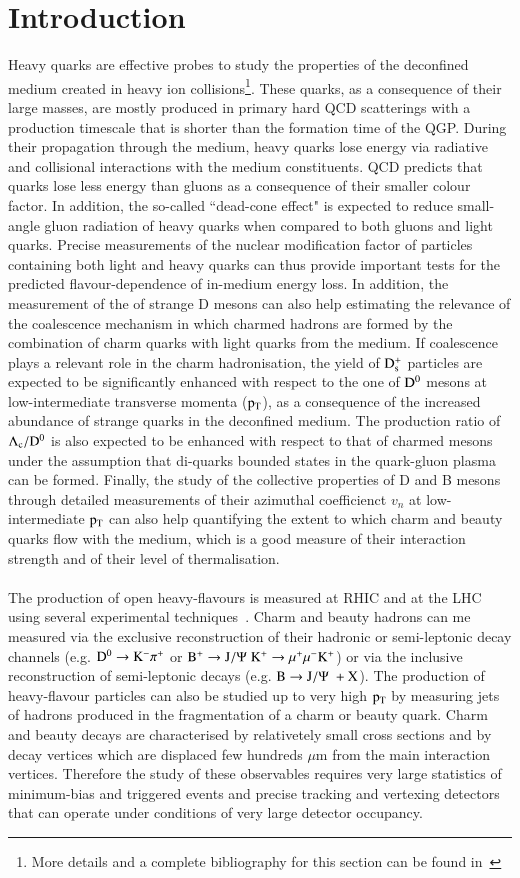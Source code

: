 \documentclass{webofc}
\begin{document}
\section{Introduction}
\label{intro}
Heavy quarks are effective probes to study the properties of the deconfined medium created in heavy ion collisions\footnote{More details and a complete bibliography for this section can 
be found in~\cite{saporegravis}}. These quarks, as a consequence of their large masses, are mostly produced in primary hard QCD scatterings with a production 
timescale that is shorter than the formation time of the QGP. During their propagation through the medium, heavy quarks lose energy via radiative and collisional 
interactions with the medium constituents. QCD predicts that quarks lose less energy than gluons as a consequence of their smaller colour factor. 
In addition, the so-called ``dead-cone effect" is expected to reduce small-angle gluon radiation of heavy quarks when compared to both 
gluons and light quarks. Precise measurements of the nuclear modification factor \raa of particles containing both light and heavy quarks can thus 
provide important tests for the predicted flavour-dependence of in-medium energy loss. In addition, the measurement of the \raa of strange D mesons 
can also help estimating the relevance of the coalescence mechanism in which charmed hadrons are formed 
by the combination of charm quarks with light quarks from the medium. If coalescence plays a relevant role in the charm hadronisation, 
the yield of $\rm D_{s}^{+}$ particles are expected to be significantly enhanced with respect to the one of $\rm D^{0}$ mesons at low-intermediate transverse momenta ($\rm p_{\rm T} $), 
as a consequence of the increased abundance of strange quarks in the deconfined medium. The production ratio of $\rm \Lambda_{c}/\rm D^{0}$ 
is also expected to be enhanced with respect to that of charmed mesons under the assumption that di-quarks bounded states in the 
quark-gluon plasma can be formed. Finally, the study of the collective properties of D and B mesons through detailed measurements of their azimuthal coefficienct $v_{n}$ 
at low-intermediate $\rm p_{\rm T} $ can also help quantifying the extent to which charm and beauty quarks flow with the medium, 
which is a good measure of their interaction strength and  of their level of thermalisation.
\\ \\
The production of open heavy-flavours is measured at RHIC and at the LHC using several experimental techniques~\cite{saporegravis}. Charm and beauty hadrons can me measured via the exclusive reconstruction 
of their hadronic or semi-leptonic decay channels (e.g. $\rm D^{0} \rightarrow K^{-} \pi^{+}$ or $\rm \rm B^{+} \rightarrow J/\Psi \hspace{0.1cm} K^{+} \rightarrow \mu^{+} \mu^{-} K^{+}$) or via the inclusive reconstruction of semi-leptonic decays (e.g. $\rm B \rightarrow J/\Psi \hspace{0.1cm}+ X$). The production of 
heavy-flavour particles can also be studied up to very high $\rm p_{\rm T} $ by measuring jets of hadrons produced in the fragmentation of a charm or beauty quark.  Charm and beauty decays are 
characterised by relativetely small cross sections and by decay vertices which are displaced few hundreds $\mu$m from the main interaction vertices.
Therefore the study of these observables requires very large statistics of minimum-bias and triggered events 
and precise tracking and vertexing detectors that can operate under conditions of very large detector occupancy. 
\end{document}
